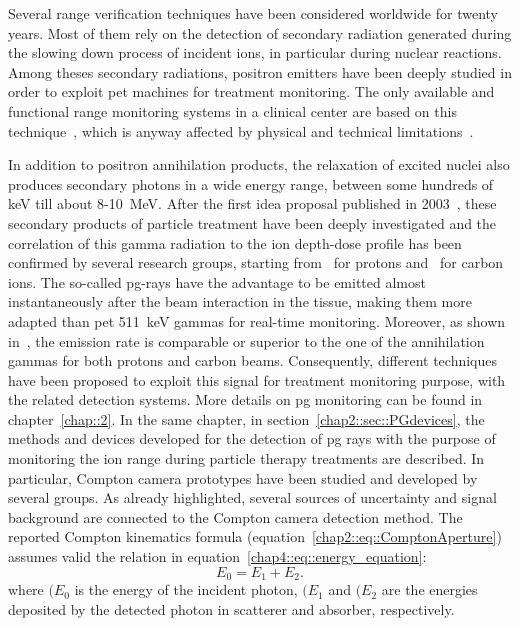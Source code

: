 Several range verification techniques have been considered worldwide for twenty years. Most of them rely on the detection of secondary radiation generated during the slowing down process of incident ions, in particular during nuclear reactions. Among theses secondary radiations, positron emitters have been deeply studied in order to exploit \gls{pet} machines for treatment monitoring. The only available and functional range monitoring systems in a clinical center are based on this technique~\parencite{Enghardt2004, Yamaya2018}, which is anyway affected by physical and technical limitations~\parencite{Parodi2015}.

In addition to positron annihilation products, the relaxation of excited nuclei also produces secondary photons in a wide energy range, between some hundreds of keV till about 8-10~MeV. After the first idea proposal published in 2003~\parencite{Stichelbaut2003}, these secondary products of particle treatment have been deeply investigated and the correlation of this gamma radiation to the ion depth-dose profile has been confirmed by several research groups, starting from~\cite{Min2006} for protons and~\cite{Testa2008} for carbon ions. The so-called \gls{pg}-rays have the advantage to be emitted almost instantaneously after the beam interaction in the tissue, making them more adapted than \gls{pet} 511~keV gammas for real-time monitoring. Moreover, as shown in~\parencite{Robert2013}, the emission rate is comparable or superior to the one of the annihilation gammas for both protons and carbon beams. Consequently, different techniques have been proposed to exploit this signal for treatment monitoring purpose, with the related detection systems. More details on \gls{pg} monitoring can be found in chapter~\ref{chap::2}.
In the same chapter, in section~\ref{chap2::sec::PGdevices}, the methods and devices developed for the detection of \gls{pg} rays with the purpose of monitoring the ion range during particle therapy treatments are described. In particular, Compton camera prototypes have been studied and developed by several groups.
As already highlighted, several sources of uncertainty and signal background are connected to the Compton camera detection method. The reported Compton kinematics formula (equation~\ref{chap2::eq::ComptonAperture}) assumes valid the relation in equation~\ref{chap4::eq::energy_equation}:
 \begin{equation}
E_{0} = E_{1}+E_{2}.
\label{chap4::eq::energy_equation}
\end{equation} 
where $(E_{0}$ is the energy of the incident photon,  $(E_{1}$ and $(E_{2}$ are the energies deposited by the detected photon in scatterer and absorber, respectively.
